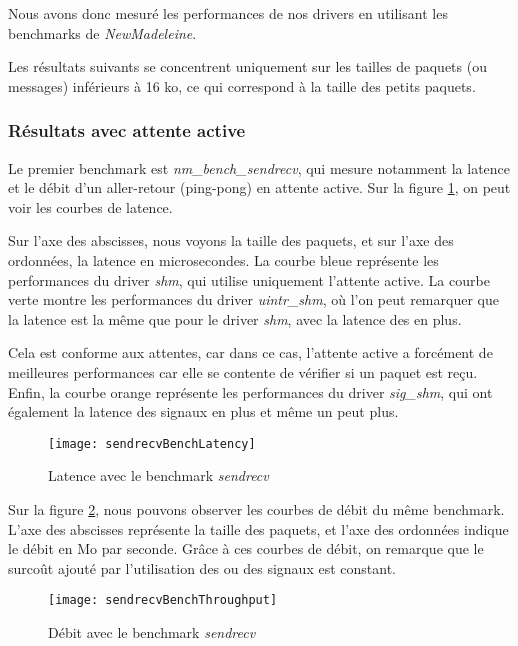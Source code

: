 Nous avons donc mesuré les performances de nos drivers en utilisant les benchmarks de \emph{NewMadeleine}.

Les résultats suivants se concentrent uniquement sur les tailles de paquets (ou messages) inférieurs à 16 ko,
ce qui correspond à la taille des petits paquets.

\subsubsection{Résultats avec attente active}

Le premier benchmark est \emph{nm_bench_sendrecv}, qui mesure notamment la latence et le débit d'un aller-retour (ping-pong) en attente active.
Sur la figure \ref{fig:sendrecvBenchLatency}, on peut voir les courbes de latence.

Sur l'axe des abscisses, nous voyons la taille des paquets, et sur l'axe des ordonnées, la latence en microsecondes.
La courbe bleue représente les performances du driver \emph{shm}, qui utilise uniquement l'attente active.
La courbe verte montre les performances du driver \emph{uintr_shm},
où l'on peut remarquer que la latence est la même que pour le driver \emph{shm},
avec la latence des \uintr{} en plus.

Cela est conforme aux attentes, car dans ce cas, l'attente active a forcément de meilleures performances car elle se contente de vérifier si un paquet est reçu.
Enfin, la courbe orange représente les performances du driver \emph{sig_shm}, qui ont également la latence des signaux en plus et même un peut plus.

\begin{figure}[H]
  \texttt{[image: sendrecvBenchLatency]}
  \caption{Latence avec le benchmark \emph{sendrecv}}
  \label{fig:sendrecvBenchLatency}
\end{figure}

Sur la figure \ref{fig:sendrecvBenchThroughput}, nous pouvons observer les courbes de débit du même benchmark.
L'axe des abscisses représente la taille des paquets, et l'axe des ordonnées indique le débit en Mo par seconde.
Grâce à ces courbes de débit, on remarque que le surcoût ajouté par l'utilisation des \uintr{} ou des signaux est constant.

\begin{figure}[H]
  \texttt{[image: sendrecvBenchThroughput]}
  \caption{Débit avec le benchmark \emph{sendrecv}}
  \label{fig:sendrecvBenchThroughput}
\end{figure}

